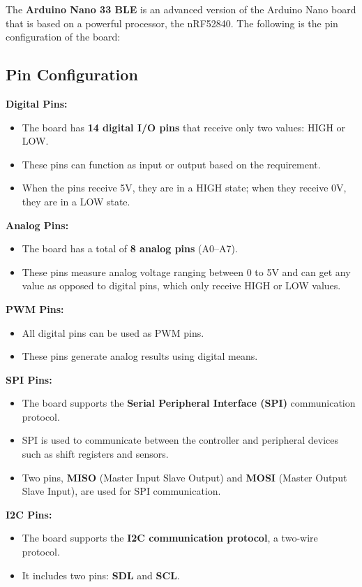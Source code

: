 The \textbf{Arduino Nano 33 BLE} is an advanced version of the Arduino Nano board that is based on a powerful processor, the nRF52840. The following is the pin configuration of the board:

\subsection{Pin Configuration}
\textbf{Digital Pins:}
\begin{itemize}[noitemsep]
	\item The board has \textbf{14 digital I/O pins} that receive only two values: HIGH or LOW.
	\item These pins can function as input or output based on the requirement.
	\item When the pins receive 5V, they are in a HIGH state; when they receive 0V, they are in a LOW state.
\end{itemize}

\textbf{Analog Pins:}
\begin{itemize}[noitemsep]
	\item The board has a total of \textbf{8 analog pins} (A0–A7).
	\item These pins measure analog voltage ranging between 0 to 5V and can get any value as opposed to digital pins, which only receive HIGH or LOW values.
\end{itemize}

\textbf{PWM Pins:}
\begin{itemize}[noitemsep]
	\item All digital pins can be used as PWM pins.
	\item These pins generate analog results using digital means.
\end{itemize}

\textbf{SPI Pins:}
\begin{itemize}[noitemsep]
	\item The board supports the \textbf{Serial Peripheral Interface (SPI)} communication protocol.
	\item SPI is used to communicate between the controller and peripheral devices such as shift registers and sensors.
	\item Two pins, \textbf{MISO} (Master Input Slave Output) and \textbf{MOSI} (Master Output Slave Input), are used for SPI communication.
\end{itemize}

\textbf{I2C Pins:}
\begin{itemize}[noitemsep]
	\item The board supports the \textbf{I2C communication protocol}, a two-wire protocol.
	\item It includes two pins: \textbf{SDL} and \textbf{SCL}.
\end{itemize}

